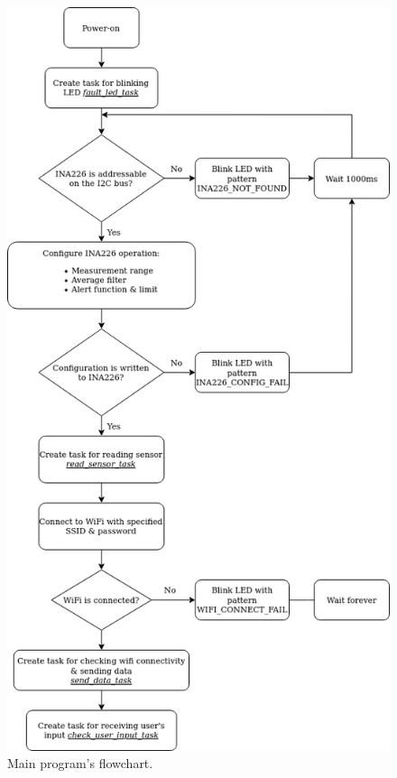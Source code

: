 \documentclass[../main.tex]{subfiles}
\begin{document}
    \begin{figure}[!h]
        \centerline{\includegraphics[scale=0.55]{media/main_program_flowchart.drawio.png}}
        \caption{Main program's flowchart.}
        \label{fig:main_program_flowchart}
    \end{figure}
\end{document}
